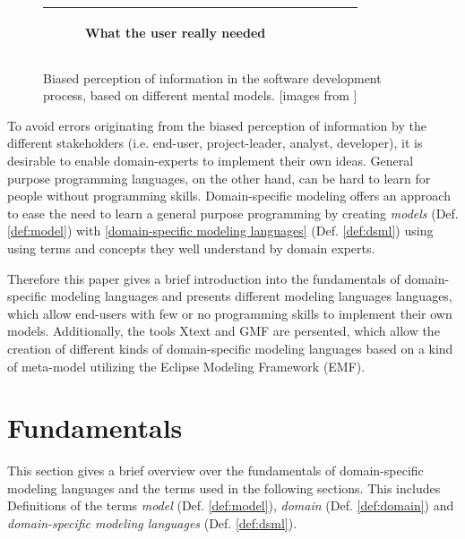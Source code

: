 \documentclass[runningheads,a4paper]{llncs}
\begin{document}
\begin{figure}[h]
\begin{center}
\begin{tabular}{|c|c|c|c|c|}
\begin{subfigure}[t]{0.15\textwidth}
\caption*{\tiny \centering What the user really needed}\label{fig:whatneeded}\end{subfigure}\\
\hline
\end{tabular}
\caption{Biased perception of information in the software development process, based on different mental models. [images from \cite{projectcartoon}]}
\label{fig:swingexample}
\end{center}
\end{figure}
To avoid errors originating from the biased perception of information by the different stakeholders (i.e. end-user, project-leader, analyst, developer), 
it is desirable to enable domain-experts to implement their own ideas.
General purpose programming languages, on the other hand, can be hard to learn for people without programming skills.
Domain-specific modeling offers an approach to ease the need to learn a general purpose programming
by creating \emph{models} (Def. \ref{def:model}) with \ref{domain-specific modeling languages} (Def. \ref{def:dsml})
using using terms and concepts they well understand by domain experts.

Therefore this paper gives a brief introduction into the fundamentals of domain-specific modeling languages and presents
different  modeling languages languages, which allow end-users with few or no programming skills to implement their own models.
Additionally, the tools Xtext and GMF are persented, which allow the creation of different kinds of domain-specific modeling languages
based on a kind of meta-model utilizing the Eclipse Modeling Framework (EMF).


\section{Fundamentals}
\label{section:fundamentals}
This section gives a brief overview over the fundamentals of domain-specific modeling languages 
and the terms used in the following sections. This includes Definitions of the terms \emph{model} (Def. \ref{def:model}), 
\emph{domain} (Def. \ref{def:domain}) and \emph{domain-specific modeling languages} (Def. \ref{def:dsml}).
\end{document}
